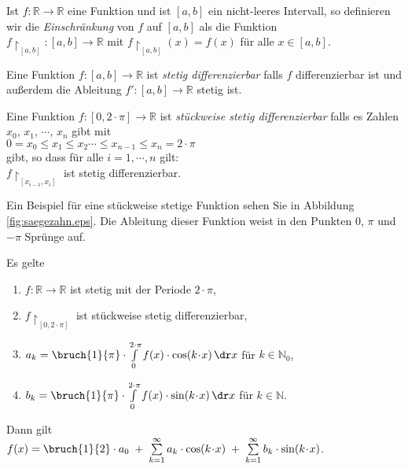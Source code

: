 \begin{Definition}
  Ist $f:\mathbb{R} \rightarrow \mathbb{R}$ eine Funktion und ist $[a,b]$ ein nicht-leeres
  Intervall, so definieren wir die \emph{Einschr\"ankung} von $f$ auf $[a,b]$ als die
  Funktion 
  \\[0.1cm]
  \hspace*{1.3cm}
  $f\!\upharpoonright_{[a,b]} : [a,b] \rightarrow \mathbb{R}$ \quad mit $f\!\upharpoonright_{[a,b]}(x) = f(x)$ f\"ur alle $x \in [a,b]$.
\end{Definition}

\begin{Definition}
  Eine Funktion $f:[a,b] \rightarrow \mathbb{R}$ ist \emph{stetig differenzierbar}
  falls $f$ differenzierbar ist und au{\ss}erdem die Ableitung $f':[a,b] \rightarrow
  \mathbb{R}$ stetig ist. 
\end{Definition}

\begin{Definition}
  Eine Funktion $f:[0,2\!\cdot\!\pi] \rightarrow \mathbb{R}$ ist \emph{st\"uckweise stetig differenzierbar} 
  falls es  Zahlen $x_0$, $x_1$, $\cdots$, $x_n$ gibt mit 
  \\[0.1cm]
  \hspace*{1.3cm}
  $0 = x_0\leq x_1 \leq x_2 \cdots \leq x_{n-1} \leq x_n = 2\!\cdot\!\pi$
  \\[0.1cm]
  gibt, so dass f\"ur alle $i=1,\cdots,n$ gilt: 
  \\[0.1cm]
  \hspace*{1.3cm}
  $f\!\upharpoonright_{[x_{i-1}, x_i]}$ ist stetig differenzierbar.  
\end{Definition}

Ein Beispiel f\"ur eine st\"uckweise stetige Funktion sehen Sie in Abbildung
\ref{fig:saegezahn.eps}.  Die Ableitung dieser Funktion weist in den Punkten $0$, $\pi$
und $-\pi$ Spr\"unge auf.
\pagebreak

\begin{Satz} Es gelte
  \begin{enumerate}
  \item $f:\mathbb{R} \rightarrow \mathbb{R}$ ist  stetig mit der Periode $2\cdot\pi$,
  \item $f\!\upharpoonright_{[0,2\!\cdot\!\pi]}$ ist  st\"uckweise stetig differenzierbar,
  \item $a_k = \bruch{1}{\pi} \cdot\int\limits_0^{2\cdot\pi}f(x)\cdot\cos(k\!\cdot\!x)\,\dr x$ \quad f\"ur $k \in \mathbb{N}_0$,
  \item $b_k = \bruch{1}{\pi}\cdot\int\limits_0^{2\cdot\pi}f(x)\cdot\sin(k\!\cdot\!x)\,\dr x$ \quad f\"ur $k \in \mathbb{N}$.  
  \end{enumerate}
  Dann gilt \\[0.1cm]
  \hspace*{1.3cm}
  $f(x) = \bruch{1}{2}\cdot a_0 \;+\; \sum\limits_{k=1}^\infty a_k\cdot \cos(k\!\cdot\!x) \;+\;
                                      \sum\limits_{k=1}^\infty b_k\cdot \sin(k\!\cdot\!x)$.
\end{Satz}

